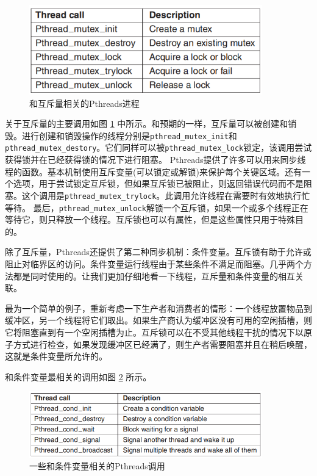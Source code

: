 	\begin{figure}[ht]\small
		\centering
		\includegraphics[width=0.90\textwidth]{FIG/2-30.png}
		\caption{和互斥量相关的Pthreads进程} \label{fig:pthreadsmutex}
	\end{figure}
	
	关于互斥量的主要调用如图 \ref{fig:pthreadsmutex} 中所示。和预期的一样，互斥量可以被创建和销毁。进行创建和销毁操作的线程分别是\texttt{pthread\_mutex\_init}和\texttt{pthread\_mutex\_destory}。它们同样可以被\texttt{pthread\_mutex\_lock}锁定，该调用尝试获得锁并在已经获得锁的情况下进行阻塞。
	Pthreads提供了许多可以用来同步线程的函数。基本机制使用互斥变量(可以锁定或解锁)来保护每个关键区域。还有一个选项，用于尝试锁定互斥锁，但如果互斥锁已被阻止，则返回错误代码而不是阻塞。这个调用是\texttt{pthread\_mutex\_trylock}。此调用允许线程在需要时有效地执行忙等待。
	最后，\texttt{pthread\_mutex\_unlock}解锁一个互斥锁，如果一个或多个线程正在等待它，则只释放一个线程。互斥锁也可以有属性，但是这些属性只用于特殊目的。
	
	除了互斥量，Pthreads还提供了第二种同步机制：条件变量。互斥锁有助于允许或阻止对临界区的访问。条件变量运行线程由于某些条件不满足而阻塞。几乎两个方法都是同时使用的。让我们更加仔细地看一下线程，互斥量和条件变量的相互关联。
	
	最为一个简单的例子，重新考虑一下生产者和消费者的情形：一个线程放置物品到缓冲区，另一个线程将它们取出。如果生产商认为缓冲区没有可用的空闲插槽，则它将阻塞直到有一个空闲插槽为止。互斥锁可以在不受其他线程干扰的情况下以原子方式进行检查，如果发现缓冲区已经满了，则生产者需要阻塞并且在稍后唤醒，这就是条件变量所允许的。
	
	和条件变量最相关的调用如图 \ref{fig:conditionvariables} 所示。
	
	\begin{figure}[ht]\small
		\centering
		\includegraphics[width=0.90\textwidth]{FIG/2-31.png}
		\caption{一些和条件变量相关的Pthreads调用} \label{fig:conditionvariables}
	\end{figure}
	

